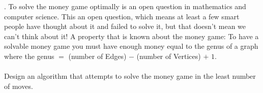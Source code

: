 \documentclass[12pt]{article}
\begin{document}
\newpage
{}. To solve the money game optimally is an open question in mathematics and computer science.
 This an open question, which means 
at least a few smart people have thought about it and failed to solve it, but that doesn't mean 
we can't think about it! A property that is known about the money game:
To have a solvable money game you must have enough money equal to the genus of a graph where 
the genus $=$ (number of Edges) $-$ (number of Vertices) $+$ $1$.\\\\
Design an algorithm that attempts to solve the money game in the least number of moves. 
\end{document}
